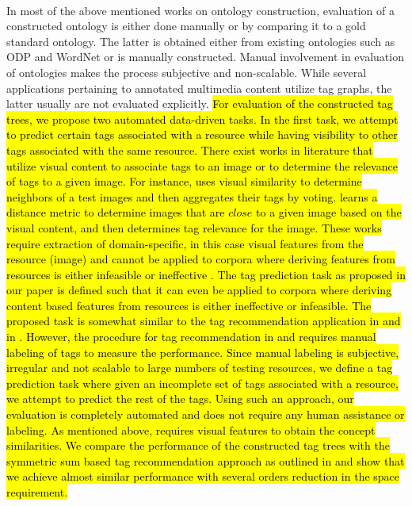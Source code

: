 {{{%
} \\
\indent In most of the above mentioned works on ontology construction, evaluation of a constructed ontology is either done manually or by comparing it to a gold standard ontology. The latter is obtained either from existing ontologies such as ODP and WordNet or is manually constructed. Manual involvement in evaluation of ontologies makes the process subjective and non-scalable. While several applications pertaining to annotated  multimedia content utilize tag graphs, the latter usually are not evaluated explicitly. \hl{For evaluation of the constructed tag trees, we propose two automated data-driven tasks. In the first task, we attempt to predict certain tags associated with a resource while having visibility to other tags associated with the same resource. There exist works in literature that utilize visual content to associate tags to an image or to determine the relevance of tags to a given image. For instance, {\cite{li2009learning}} uses visual similarity to determine neighbors of a test images and then aggregates their tags by voting. {\cite{wu2009distance}} learns a distance metric to determine images that are $close$ to a given image based on the visual content, and then determines tag relevance for the image. These works require extraction of domain-specific, in this case visual features from the resource (image) and cannot be applied to corpora where deriving features from resources is either infeasible or ineffective {\cite{huang2010text}\cite{song2010taxonomic}\cite{zanetti2008walk}\cite{yin2009exploring}}. The tag prediction task as proposed in our paper is defined such that it can even be applied to corpora where deriving content based features from resources is either ineffective or infeasible.
The proposed task is somewhat similar to the tag recommendation application in  {\cite{katsurai2013cross}} and in {\cite{sigurbjornsson2008flickr}}. However, the procedure for tag recommendation in {\cite{katsurai2013cross}} and  {\cite{sigurbjornsson2008flickr}} requires manual labeling of tags to measure the performance. Since manual labeling is subjective, irregular and not scalable to large numbers of testing resources, we define a tag prediction task where given an incomplete set of tags associated with a resource, we attempt to predict the rest of the tags. Using such an approach, our evaluation is completely automated and does not require any human assistance or labeling. As mentioned above, {\cite{katsurai2013cross}} requires visual features to obtain the concept similarities. We compare the performance of the constructed tag trees with the symmetric sum based tag recommendation approach as outlined in {\cite{sigurbjornsson2008flickr}} and show that we achieve almost similar performance with several orders reduction in the space requirement.  \\
}}}
